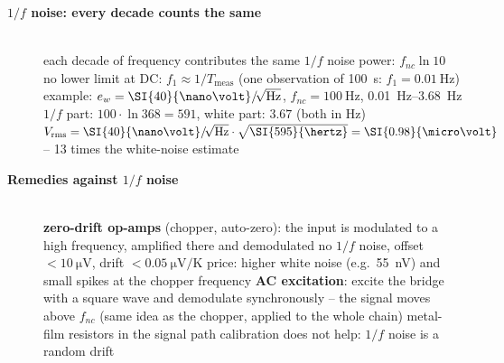 \begin{description}
\item[{\rot\bf $1/f$ noise: every decade counts the same}]~\\[-\lblskip]
\bi
	\ite each decade of frequency contributes the same $1/f$ noise power: $f_{nc}\ln 10$
	\ite no lower limit at DC: $f_1 \approx 1/T_\mathrm{meas}$ (one observation of \SI{100}{\second}: $f_1 = \SI{0.01}{\hertz}$)
	\ite example: $e_w = \SI{40}{\nano\volt}\rtHz$, $f_{nc} = \SI{100}{\hertz}$, \SIrange{0.01}{3.68}{\hertz}
	\itee $1/f$ part: $100\cdot\ln 368 = 591$, white part: $3.67$ (both in \si{\hertz})
	\itee $V_\mathrm{rms} = \SI{40}{\nano\volt}\rtHz\cdot\sqrt{\SI{595}{\hertz}} = \SI{0.98}{\micro\volt}$ -- 13 times the white-noise estimate
\ei
{}
\os{\newpage}

\item[{\rot\bf Remedies against $1/f$ noise}]~\\[-\lblskip]
\bi
	\ite \textbf{zero-drift op-amps} (chopper, auto-zero): the input is modulated to a high frequency, amplified there and demodulated
	\itee no $1/f$ noise, offset $<\SI{10}{\micro\volt}$, drift $<\SI{0.05}{\micro\volt\per\kelvin}$
	\itee price: higher white noise (e.g.\ \SI{55}{\nano\volt}\rtHz) and small spikes at the chopper frequency
	\ite \textbf{AC excitation}: excite the bridge with a square wave and demodulate synchronously -- the signal moves above $f_{nc}$ (same idea as the chopper, applied to the whole chain)
	\ite metal-film resistors in the signal path
	\ite calibration does not help: $1/f$ noise is a random drift
\ei
\os{\newpage}


\end{description}
